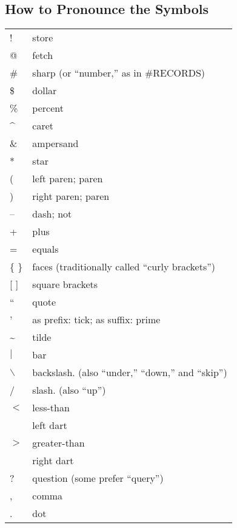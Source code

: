 \subsection{How to Pronounce the Symbols}
\begin{tabular}{ll}
{}{\setlength{\parsep}{0cm}}
!&store\\
@&fetch\\
\#&sharp (or ``number,'' as in \#RECORDS)\\
\$&dollar\\
\%&percent\\
\^{ }&caret\\
\&&ampersand\\
{*}&star\\
(&left paren; paren\\
)&right paren; paren\\
--&dash; not\\
+&plus\\
=&equals\\
\{ \}&faces (traditionally called ``curly brackets'')\\
{[} {]}&square brackets\\
``&quote\\
'&as prefix: tick; as suffix: prime\\
\~{ }&tilde\\
\(|\)&bar\\
\(\backslash\)&backslash. (also ``under,'' ``down,'' and ``skip'')\\
/&slash. (also ``up'')\\
\(<\)&less-than\\
 &left dart\\
\(>\)&greater-than\\
 &right dart\\
?&question (some prefer ``query'')\\
,&comma\\
.&dot\\
\end{tabular}

